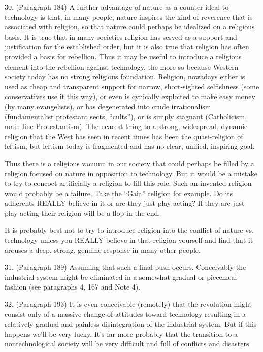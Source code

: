 30. (Paragraph 184) A further advantage of nature as a counter-ideal to technology is that, in many people, nature inspires the kind of reverence that is associated with religion, so that nature could perhaps be idealized on a religious basis. It is true that in many societies religion has served as a support and justification for the established order, but it is also true that religion has often provided a basis for rebellion. Thus it may be useful to introduce a religious element into the rebellion against technology, the more so because Western society today has no strong religious foundation. Religion, nowadays either is used as cheap and transparent support for narrow, short-sighted selfishness (some conservatives use it this way), or even is cynically exploited to make easy money (by many evangelists), or has degenerated into crude irrationalism (fundamentalist protestant sects, “cults”), or is simply stagnant (Catholicism, main-line Protestantism). The nearest thing to a strong, widespread, dynamic religion that the West has seen in recent times has been the quasi-religion of leftism, but leftism today is fragmented and has no clear, unified, inspiring goal.

Thus there is a religious vacuum in our society that could perhaps be filled by a religion focused on nature in opposition to technology. But it would be a mistake to try to concoct artificially a religion to fill this role. Such an invented religion would probably be a failure. Take the “Gaia” religion for example. Do its adherents REALLY believe in it or are they just play-acting? If they are just play-acting their religion will be a flop in the end.

It is probably best not to try to introduce religion into the conflict of nature vs. technology unless you REALLY believe in that religion yourself and find that it arouses a deep, strong, genuine response in many other people.

31. (Paragraph 189) Assuming that such a final push occurs. Conceivably the industrial system might be eliminated in a somewhat gradual or piecemeal fashion (see paragraphs 4, 167 and Note 4).

32. (Paragraph 193) It is even conceivable (remotely) that the revolution might consist only of a massive change of attitudes toward technology resulting in a relatively gradual and painless disintegration of the industrial system. But if this happens we’ll be very lucky. It’s far more probably that the transition to a nontechnological society will be very difficult and full of conflicts and disasters.

